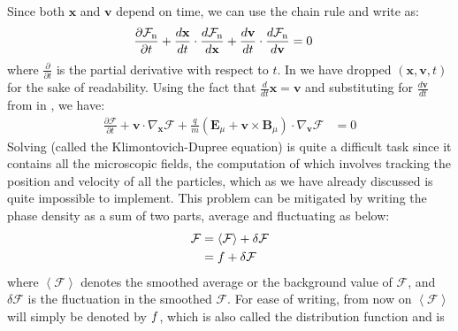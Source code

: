             Since both $\mathbf{x}$ and $\mathbf{v}$ depend on time, we can use the chain rule and
            write  as:
            \begin{align}
            \frac{\partial \mathcal{F}_{\rm n}}{\partial t} + \frac{d \mathbf{x}}{d t} \cdot \frac{d \mathcal{F}_{\rm n}}{d \mathbf{x}} + \frac{d \mathbf{v}}{d t} \cdot \frac{d \mathcal{F}_{\rm n}}{d \mathbf{v}} & = 0 \label{eq:cons2}
            \end{align}
            where $\frac{\partial}{\partial t}$ is the partial derivative with respect to $t$. In
             we have dropped $(\mathbf{x},\mathbf{v},t)$ for the sake of readability.
            Using the fact that $\frac{d}{d t}\mathbf{x}=\mathbf{v}$ and substituting for $\frac{d
            \mathbf{v}}{d t}$ from  in , we have:
            \begin{align}
            \frac{\partial \mathcal{F}}{\partial t} + \mathbf{v} \cdot \nabla_{\mathbf{x}} \mathcal{F} + \frac{q}{m}\left(\mathbf{E}_\mu + \mathbf{v} \times \mathbf{B}_\mu\right) \cdot \nabla_{\mathbf{v}} \mathcal{F} & = 0 \label{eq:cons3}
            \end{align}
            Solving  (called the Klimontovich-Dupree equation) is quite a difficult
            task since it contains all the microscopic fields, the computation of which involves
            tracking the position and velocity of all the particles, which as we have already
            discussed is quite impossible to implement. This problem can be mitigated by writing the
            phase density as a sum of two parts, average and fluctuating as below:
            \begin{align}
                \begin{split}
                    \mathcal{F} & = \left<\mathcal{F}\right> + \delta\mathcal{F} \label{eq:pd1}\\
                    & = \mathnormal{f} + \delta\mathcal{F}
                \end{split}
            \end{align}
            where $\left<\mathcal{F}\right>$ denotes the smoothed average or the background value of
            $\mathcal{F}$, and $\delta \mathcal{F}$ is the fluctuation in the smoothed
            $\mathcal{F}$.  For ease of writing, from now on $\left<\mathcal{F}\right>$ will simply
            be denoted by $\mathnormal{f}$, which is also called the distribution function and is
